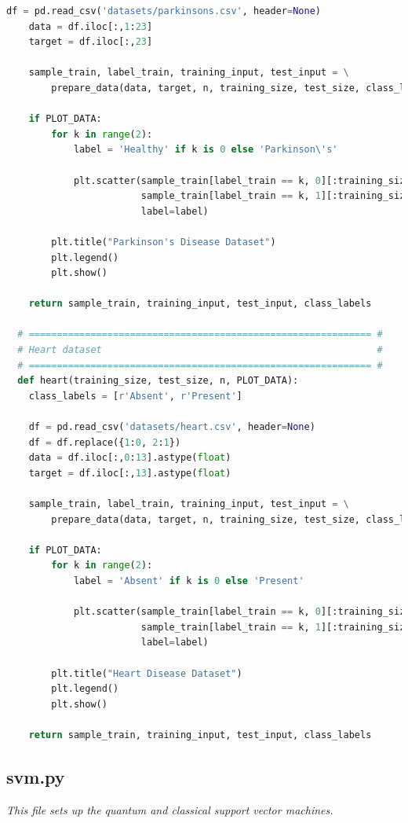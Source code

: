 \documentclass{article}
\begin{document}
\begin{lstlisting}[language=Python]
    df = pd.read_csv('datasets/parkinsons.csv', header=None)
    data = df.iloc[:,1:23]
    target = df.iloc[:,23]

    sample_train, label_train, training_input, test_input = \
        prepare_data(data, target, n, training_size, test_size, class_labels)

    if PLOT_DATA:
        for k in range(2):
            label = 'Healthy' if k is 0 else 'Parkinson\'s'

            plt.scatter(sample_train[label_train == k, 0][:training_size],
                        sample_train[label_train == k, 1][:training_size],
                        label=label)

        plt.title("Parkinson's Disease Dataset")
        plt.legend()
        plt.show()

    return sample_train, training_input, test_input, class_labels

  # ============================================================= #
  # Heart dataset                                                 #
  # ============================================================= #
  def heart(training_size, test_size, n, PLOT_DATA):
    class_labels = [r'Absent', r'Present']

    df = pd.read_csv('datasets/heart.csv', header=None)
    df = df.replace({1:0, 2:1})
    data = df.iloc[:,0:13].astype(float)
    target = df.iloc[:,13].astype(float)

    sample_train, label_train, training_input, test_input = \
        prepare_data(data, target, n, training_size, test_size, class_labels)

    if PLOT_DATA:
        for k in range(2):
            label = 'Absent' if k is 0 else 'Present'

            plt.scatter(sample_train[label_train == k, 0][:training_size],
                        sample_train[label_train == k, 1][:training_size],
                        label=label)

        plt.title("Heart Disease Dataset")
        plt.legend()
        plt.show()

    return sample_train, training_input, test_input, class_labels
  \end{lstlisting}

\subsection*{svm.py}
  \begin{center}
    \textit{This file sets up the quantum and classical support vector machines.}
  \end{center}
\end{document}
